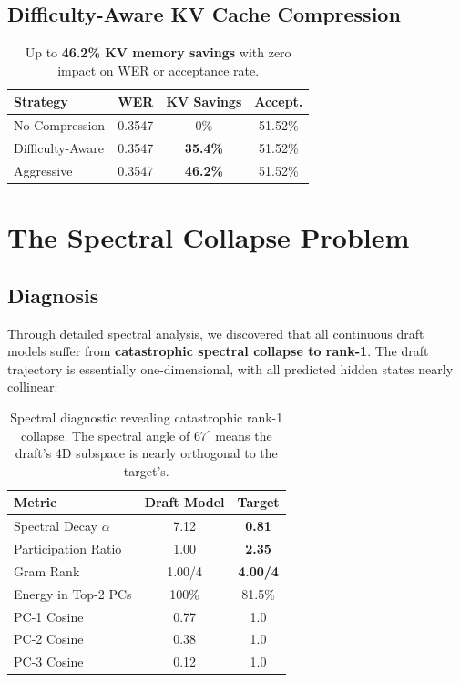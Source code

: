 \documentclass[11pt,a4paper]{article}
\begin{document}
\subsection{Difficulty-Aware KV Cache Compression}

\begin{table}[H]
\centering
\small
\begin{tabular}{@{}lccc@{}}
\toprule
\textbf{Strategy} & \textbf{WER} & \textbf{KV Savings} & \textbf{Accept.} \\
\midrule
No Compression & 0.3547 & 0\% & 51.52\% \\
Difficulty-Aware & 0.3547 & \textbf{35.4\%} & 51.52\% \\
Aggressive & 0.3547 & \textbf{46.2\%} & 51.52\% \\
\bottomrule
\end{tabular}
\caption{Up to \textbf{46.2\% KV memory savings} with zero impact on WER or acceptance rate.}
\label{tab:kv}
\end{table}


\section{The Spectral Collapse Problem}

\subsection{Diagnosis}
Through detailed spectral analysis, we discovered that all continuous draft models suffer from \textbf{catastrophic spectral collapse to rank-1}. The draft trajectory is essentially one-dimensional, with all predicted hidden states nearly collinear:

\begin{table}[H]
\centering
\small
\begin{tabular}{@{}lcc@{}}
\toprule
\textbf{Metric} & \textbf{Draft Model} & \textbf{Target} \\
\midrule
Spectral Decay $\alpha$ & 7.12 & \textbf{0.81} \\
Participation Ratio & 1.00 & \textbf{2.35} \\
Gram Rank & 1.00/4 & \textbf{4.00/4} \\
Energy in Top-2 PCs & 100\% & 81.5\% \\
PC-1 Cosine & 0.77 & 1.0 \\
PC-2 Cosine & 0.38 & 1.0 \\
PC-3 Cosine & 0.12 & 1.0 \\
\bottomrule
\end{tabular}
\caption{Spectral diagnostic revealing catastrophic rank-1 collapse.
The spectral angle of $67^\circ$ means the draft's 4D subspace is nearly orthogonal to the target's.}
\label{tab:spectral}
\end{table}
\end{document}
